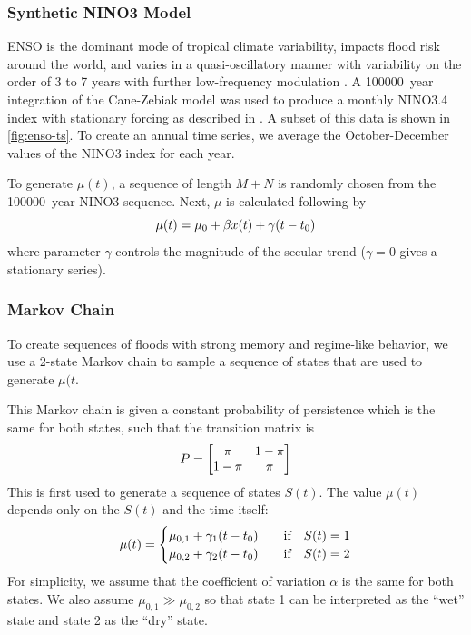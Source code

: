 \documentclass[12pt]{article}
\begin{document}
\subsubsection{Synthetic NINO3 Model\label{sec:methods-nino}}

ENSO is the dominant mode of tropical climate variability, impacts flood risk around the world, and varies in a quasi-oscillatory manner with variability on the order of 3 to 7 years with further low-frequency modulation \citep{Sarachik2010}.
A \SI{100000}{year} integration of the Cane-Zebiak model \citep{Zebiak1987} was used to produce a monthly NINO3.4 index with stationary forcing as described in \citet{Ramesh2017}.
A subset of this data is shown in \cref{fig:enso-ts}.
To create an annual time series, we average the October-December values of the NINO3 index for each year.

To generate \(\mu(t)\), a sequence of length \(M+N\) is randomly chosen from the \SI{100000}{year} NINO3 sequence.
Next, \(\mu\) is calculated following by
\begin{equation}
  \mu(t) = \mu_0 + \beta x(t) + \gamma \qty(t - t_0)
\end{equation}
where parameter \(\gamma\) controls the magnitude of the secular trend (\(\gamma=0\) gives a stationary series).

\subsubsection{Markov Chain\label{sec:methods-markov}}

To create sequences of floods with strong memory and regime-like behavior, we use a 2-state Markov chain to sample a sequence of states that are used to generate \(\mu(t\).

This Markov chain is given a constant probability of persistence which is the same for both states, such that the transition matrix is
\begin{equation*}
  P = \mqty[\pi & 1-\pi \\ 1-\pi & \pi]
\end{equation*}
This is first used to generate a sequence of states \(S(t)\).
The value \( \mu(t) \) depends only on the \(S(t)\) and the time itself:
\begin{equation*}
  \mu(t) = \begin{cases}
    \mu_{0,1} + \gamma_1 \qty(t - t_0) & \qqtext{if} S(t) = 1 \\
    \mu_{0,2} + \gamma_2 \qty(t - t_0) & \qqtext{if} S(t) = 2
  \end{cases}
\end{equation*}
For simplicity, we assume that the coefficient of variation \( \alpha \) is the same for both states.
We also assume \( \mu_{0, 1} \gg \mu_{0, 2} \) so that state 1 can be interpreted as the ``wet'' state and state 2 as the ``dry'' state.
\end{document}
